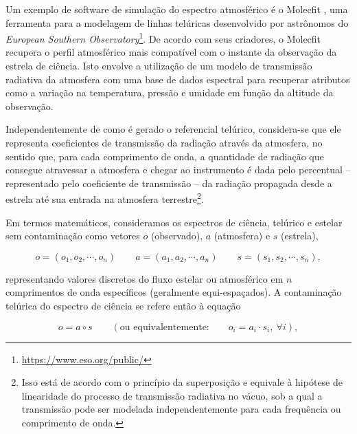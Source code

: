 Um exemplo de software de simulação do espectro atmosférico é o Molecfit \citep{smette2015molecfit}, uma ferramenta para a modelagem de linhas telúricas desenvolvido por astrônomos do \textit{European Southern Observatory}\footnote{\url{https://www.eso.org/public/}}. De acordo com seus criadores, o Molecfit recupera o perfil atmosférico mais compatível com o instante da observação da estrela de ciência. Isto envolve a utilização de um modelo de transmissão radiativa da atmosfera com uma base de dados espectral para recuperar atributos como a variação na temperatura, pressão e umidade em função da altitude da observação.

Independentemente de como é gerado o referencial telúrico, considera-se que ele representa coeficientes de transmissão da radiação através da atmosfera, no sentido que, para cada comprimento de onda, a quantidade de radiação que consegue atravessar a atmosfera e chegar ao instrumento é dada pelo percentual -- representado pelo coeficiente de transmissão -- da radiação propagada desde a estrela até sua entrada na atmosfera terrestre\footnote{Isso está de acordo com o princípio da superposição e equivale à hipótese de linearidade do processo de transmissão radiativa no vácuo, sob a qual a transmissão pode ser modelada independentemente para cada frequência ou comprimento de onda.}. %

Em termos matemáticos, consideramos os espectros de ciência, telúrico e estelar sem contaminação como vetores $o$ (observado), $a$ (atmosfera) e $s$ (estrela),

\begin{equation*}
    o = (o_1, o_2, \cdots, o_{n}) \qquad a = (a_1, a_2, \cdots, a_{n}) \qquad s = (s_1, s_2, \cdots, s_{n}), 
\end{equation*}

\noindent representando valores discretos do fluxo estelar ou atmosférico em $n$ comprimentos de onda específicos (geralmente equi-espaçados). A contaminação telúrica do espectro de ciência se refere então à equação

\begin{equation*}
    o = a \circ s \qquad \left(\mbox{ou equivalentemente:} \qquad o_i = a_i\cdot s_i,\ \forall i\right),
\end{equation*}

